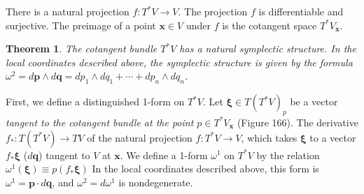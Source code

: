 \documentclass{book}
\numberwithin{equation}{section}
\theoremstyle{plain}
\newtheorem*{thm*}{Theorem}
\let\oldendproof\endproof
\renewenvironment{proof}[1][\proofname]{%
  \oldproof[\textsc{#1}]%
}{\oldendproof}
\theoremstyle{definition}
\theoremstyle{remark}
\theoremstyle{smallcap}
\numberwithin{prob}{section}
\begin{document}
There is a natural projection
$f: T^*V \rightarrow V$.
%
The projection $f$ is differentiable and surjective.
%
The preimage of a point $\mathbf x \in V$ under $f$
is the cotangent space $T^*V_{\mathbf x}$.


\begin{thm*}
The cotangent bundle $T^*V$ has a natural symplectic structure.
%
In the local coordinates described above,
the symplectic structure is given by the formula
$\omega^2 = d\mathbf p \wedge d\mathbf q = dp_1 \wedge dq_1 + \cdots + dp_n \wedge dq_n$.
\end{thm*}

\begin{proof}
First, we define a distinguished 1-form on $T^*V$.
%
Let $\pmb \xi \in T(T^*V)_p$ be a vector
\emph{tangent to the cotangent bundle at the point $p \in T^*V_{\mathbf x}$}
(Figure 166).
%
The derivative $f_*: T(T^*V) \rightarrow TV$
of the natural projection $f: T^*V \rightarrow V$,
which takes $\pmb \xi$ to a vector $f_* \pmb \xi$ ($d\mathbf q$)
tangent to $V$ at $\mathbf x$.
%
We define a 1-form $\omega^1$ on $T^*V$ by the relation
$\omega^1(\pmb \xi) \equiv p( f_*\pmb \xi )$
%
In the local coordinates described above,
this form is
$\omega^1 = \mathbf p \cdot d\mathbf q$,
and
$\omega^2 = d\omega^1$ is nondegenerate.

\setcounter{figure}{165}
\begin{figure}
  \centering
\end{figure}
\end{proof}
\end{document}
